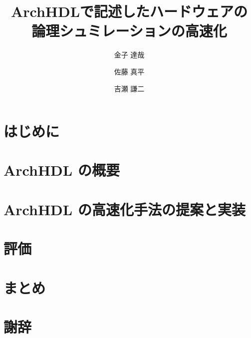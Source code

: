 \documentclass[submit,techreq,noauthor,papersize,]{ipsj}
\title{ArchHDLで記述したハードウェアの\\ 論理シュミレーションの高速化}
\author{金子 達哉}{Kaneko Tatsuya}{TOKYOTECH_B}[kaneko@arch.cs.titech.ac.jp]
\author{佐藤 真平}{Sato Shimpei}{TOKYOTECH}[satos@arch.cs.titech.ac.jp]
\author{吉瀬 謙二}{Kise Kenji}{TOKYOTECH}[kise@cs.titech.ac.jp]
\author{}
\date{}
\begin{document}
\begin{abstract}
 
\end{abstract}

\maketitle

\section{はじめに}



\section{ArchHDL の概要}

\label{s:summary}



\section{ArchHDL の高速化手法の提案と実装}

\label{s:method}



\section{評価}

\label{s:evaluation}



\section{まとめ}

\label{s:conclusion}



\section*{謝辞}

\label{s:acknowledgment}




\end{document}
